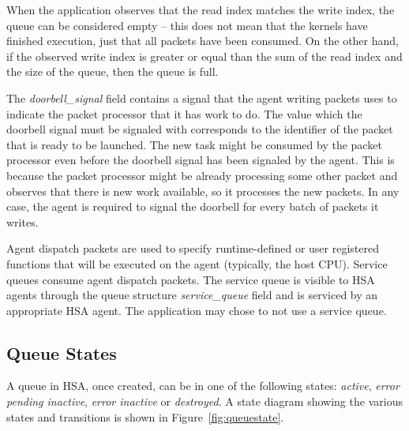 \documentclass[final]{book}
\newcommand{\reffld}[1]{\textit{#1}}
\begin{document}
When the application observes that the read index matches the write index, the
queue can be considered empty -- this does not mean that the kernels have
finished execution, just that all packets have been consumed. On the other hand,
if the observed write index is greater or equal than the sum of the read index
and the size of the queue, then the queue is full.

The \reffld{doorbell_signal} field contains a signal that the agent writing
packets uses to indicate the packet processor that it has work to do. The value
which the doorbell signal must be signaled with corresponds to the identifier of
the packet that is ready to be launched.  The new task might be consumed by the
packet processor even before the doorbell signal has been signaled by the
agent. This is because the packet processor might be already processing some
other packet and observes that there is new work available, so it processes the
new packets. In any case, the agent is required to signal the doorbell for every
batch of packets it writes.

Agent dispatch packets are used to specify runtime-defined or user registered
functions that will be executed on the agent (typically, the host CPU). Service
queues consume agent dispatch packets. The service queue is visible to HSA
agents through the queue structure \reffld{service_queue} field and is serviced
by an appropriate HSA agent. The application may chose to not use a service
queue.

\hypertarget{queue-errors}{}\subsection{Queue States} \label{queue-errors}

A queue in HSA, once created, can be in one of the following states:
\emph{active}, \emph{error pending inactive}, \emph{error inactive} or
\emph{destroyed}. A state diagram showing the various states and transitions is
shown in Figure~\ref{fig:queuestate}.
\end{document}
